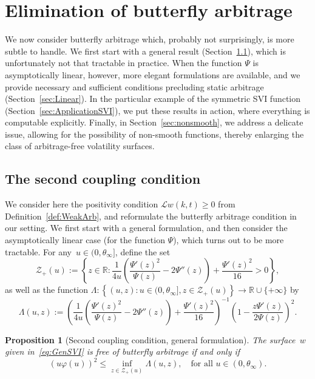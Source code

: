 \documentclass{amsart}[11pt]
\numberwithin{equation}{section}
\newtheorem{proposition}[theorem]{Proposition}
\theoremstyle{definition}
\newcommand{\RR}{\mathbb{R}}
\newcommand{\Ll}{\mathcal{L}}
\newcommand{\Zz}{\mathcal{Z}}
\begin{document}
\section{Elimination of butterfly arbitrage \label{sec_butter}}
We now consider butterfly arbitrage which, probably not surprisingly, is more subtle to handle.
We first start with a general result (Section~\ref{sec:Coupling21}), which is unfortunately not that tractable in practice.
When the function $\Psi$ is asymptotically linear, however, more elegant formulations are available, 
and we provide necessary and sufficient conditions precluding static arbitrage (Section~\ref{sec:Linear}).
In the particular example of the symmetric SVI function (Section~\ref{sec:ApplicationSVI}), 
we put these results in action,
where everything is computable explicitly.
Finally, in Section~\ref{sec:nonsmooth}, we address a delicate issue, allowing for the possibility of non-smooth functions, 
thereby enlarging the class of arbitrage-free volatility surfaces.




\subsection{The second coupling condition}\label{sec:Coupling21}
We consider here the positivity condition $\Ll w (k,t)\geq0$ from Definition~\ref{def:WeakArb}, 
and reformulate the butterfly arbitrage condition in our setting.
We first start with a general formulation, and then consider the asymptotically linear case (for the function $\Psi$), 
which turns out to be more tractable.
For any~$u \in (0,\theta_\infty]$, define the set 
\begin{equation}\label{eq:SetZ+}
\Zz_+(u) := \left\{z \in \mathbb{R}: \frac{1}{4 u} \left(\frac{\Psi'(z)^2}{\Psi(z)}-2\Psi''(z)\right)
+\frac{\Psi'(z)^2}{16} > 0\right\},
\end{equation}
as well as the function
$\Lambda:\left\{(u, z): u\in (0, \theta_\infty], z \in \Zz_+(u)\right\}\to \RR \cup\{+\infty\}$ by
\begin{equation}\label{eq:Lambda}
\Lambda(u, z) := 
\left(\frac{1}{4 u} \left(\frac{\Psi'(z)^{2}}{\Psi(z)}-2\Psi''(z)\right)+\frac{\Psi'(z)^{2}}{16}\right)^{-1}\left(1-\frac{z\Psi'(z)}{2\Psi(z)}\right)^2.
\end{equation}
\begin{proposition}[Second coupling condition, general formulation]
\label{prop:Coupling2}
The surface~$w$ given in~\eqref{eq:GenSVI} is free of butterfly arbitrage if and only if
\begin{equation}\label{eq:Coupling2Iff}
(u \varphi(u))^2 \leq 
\inf_{z \in \Zz_+(u)} \Lambda(u, z),
\quad\text{for all }u \in (0, \theta_\infty).
\end{equation}
\end{proposition}
\end{document}
